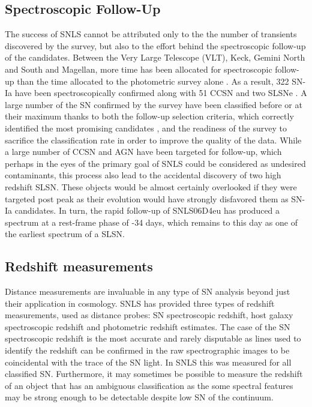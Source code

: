 \subsection{Spectroscopic Follow-Up}
The success of SNLS cannot be attributed only to the the number of transients discovered by the survey, but also to the effort behind the spectroscopic follow-up of the candidates. Between the Very Large Telescope (VLT), Keck, Gemini North and South and Magellan, more time has been allocated for spectroscopic follow-up than the time allocated to the photometric survey alone \citep{Pritchet2004}. As a result, 322 SN-Ia have been spectroscopically confirmed along with 51 CCSN and two SLSNe \citep{Guy2010,Howell2005,Howell2013}. A large number of the SN confirmed by the survey have been classified before or at their maximum thanks to both the follow-up selection criteria, which correctly identified the most promising candidates \citep{Sullivan2006}, and the readiness of the survey to sacrifice the classification rate in order to improve the quality of the data. While a large number of CCSN and AGN have been targeted for follow-up, which perhaps in the eyes of the primary goal of SNLS could be considered as undesired contaminants, this process also lead to the accidental discovery of two high redshift SLSN. These objects would be almost certainly overlooked if they were targeted post peak as their evolution would have strongly disfavored them as SN-Ia candidates. In turn, the rapid follow-up of SNLS06D4eu has produced a spectrum at a rest-frame phase of -34 days, which remains to this day as one of the earliest spectrum of a SLSN.

\subsection{Redshift measurements}
Distance measurements are invaluable in any type of SN analysis beyond just their application in cosmology. SNLS has provided three types of redshift measurements, used as distance probes: SN spectroscopic redshift, host galaxy spectroscopic redshift and photometric redshift estimates. The case of the SN spectroscopic redshift is the most accurate and rarely disputable as lines used to identify the redshift can be confirmed in the raw spectrographic images to be coincidental with the trace of the SN light. In SNLS this was measured for all classified SN. Furthermore, it may sometimes be possible to measure the redshift of an object that has an ambiguous classification as the some spectral features may be strong enough to be detectable despite low S\/N of the continuum.

